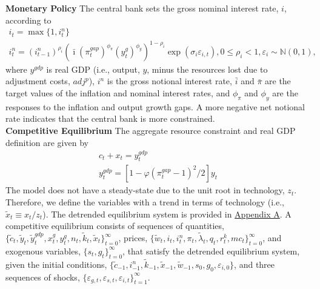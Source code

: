 \documentclass[12pt, final]{article}
\begin{document}
\noindent
\textbf{Monetary Policy} The central bank sets the gross nominal interest rate, $i$, according to
\begin{gather}
    \label{eq:15}
    i_t=\max\{1,i_t^n\}\\
      \label{eq:16}
  i_t^n=(i^n_{t-1})^{\rho_i}(\bar{\imath}(\pi^{gap}_t)^{\phi_\pi}(y^{g}_{t})^{\phi_y})^{1-\rho_i}\exp(\sigma_i\varepsilon_{i,t}), 0 \leq \rho_i < 1, \varepsilon_i \sim \mathds{N}(0,1),
  \end{gather}
where $y^{gdp}$ is real GDP (i.e., output, $y$, minus the resources lost due to adjustment costs, $adj^p$), $i^n$ is the gross notional interest rate, $\bar i$ and $\bar{\pi}$ are the target values of the inflation and nominal interest rates, and $\phi_\pi$ and $\phi_y$ are the responses to the inflation and output growth gaps. A more negative net notional rate indicates that the central bank is more constrained.\\

\noindent
\textbf{Competitive Equilibrium} The aggregate resource constraint and real GDP definition are given by
\begin{gather}
  c_t + x_t = y_t^{gdp}\\
  y_t^{gdp} = [1 - \varphi(\pi_t^{gap}-1)^2/2]y_t
\end{gather}
The model does not have a steady-state due to the unit root in technology, $z_t$. Therefore, we define the variables with a trend in terms of technology (i.e., $\tilde{x}_t \equiv x_t/z_t$). The detrended equilibrium system is provided in \hyperlink{Appendix A}{Appendix A}. A competitive equilibrium consists of sequences of quantities, $\{\tilde{c}_t, \tilde{y}_t, \tilde{y}_t^{gdp}, x^g_t, y^g_t, n_t, \tilde{k}_t, \tilde{x}_t\}_{t=0}^\infty$, prices, $\{\tilde{w}_t, i_t, i^n_t, \pi_t, \tilde{\lambda}_t, q_t, r^k_t, mc_t\}_{t=0}^\infty$, and exogenous variables, $\{s_t,g_t\}_{t=0}^\infty$, that satisfy the detrended equilibrium system, given the initial conditions, $\{\tilde{c}_{-1}, i^n_{-1}, \tilde{k}_{-1}, \tilde{x}_{-1}, \tilde{w}_{-1}, s_0, g_0, \varepsilon_{i,0}\}$, and three sequences of shocks, $\{\varepsilon_{g,t}, \varepsilon_{s,t}, \varepsilon_{i,t}\}_{t=1}^\infty$.
\end{document}
